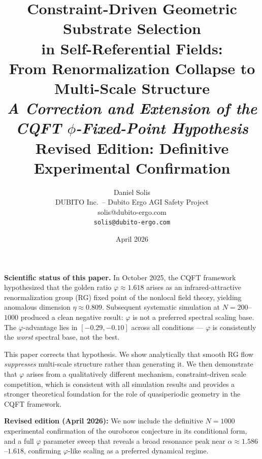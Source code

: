 \documentclass[11pt,a4paper]{article}
\title{%
  \textbf{Constraint-Driven Geometric Substrate Selection\\
  in Self-Referential Fields:}\\[6pt]
  \large From Renormalization Collapse to Multi-Scale Structure\\[6pt]
  \normalsize \textit{A Correction and Extension of the CQFT $\phi$-Fixed-Point
  Hypothesis}\\[8pt]
  \normalsize \textbf{Revised Edition: Definitive Experimental Confirmation}
}
\author{%
  Daniel Solis\\[4pt]
  \small DUBITO Inc.\ -- Dubito Ergo AGI Safety Project\\
  \small solis@dubito-ergo.com\\
  \small \texttt{solis@dubito-ergo.com}
}
\date{\small April 2026}
\theoremstyle{plain}
\theoremstyle{definition}
\newcommand{\phiGolden}{\varphi}
\begin{document}
\bigskip
\maketitle

\begin{correctionbox}
\textbf{Scientific status of this paper.}
In October 2025, the CQFT framework hypothesized that the golden ratio
$\phiGolden \approx 1.618$ arises as an infrared-attractive renormalization
group (RG) fixed point of the nonlocal field theory, yielding anomalous
dimension $\eta \approx 0.809$. Subsequent systematic simulation at
$N = 200$--$1000$ produced a clean negative result: $\phiGolden$ is not a
preferred spectral scaling base. The $\phiGolden$-advantage lies in
$[-0.29, -0.10]$ across all conditions --- $\phiGolden$ is consistently
the \emph{worst} spectral base, not the best.

This paper corrects that hypothesis. We show analytically that smooth RG
flow \emph{suppresses} multi-scale structure rather than generating it.
We then demonstrate that $\phiGolden$ arises from a qualitatively different
mechanism, constraint-driven scale competition, which is consistent
with all simulation results and provides a stronger theoretical foundation
for the role of quasiperiodic geometry in the CQFT framework.

\textbf{Revised edition (April 2026):} We now include the definitive
$N = 1000$ experimental confirmation of the ouroboros conjecture in its
conditional form, and a full $\phiGolden$ parameter sweep that reveals a
broad resonance peak near $\alpha \approx 1.586$--$1.618$, confirming
$\phiGolden$-like scaling as a preferred dynamical regime.
\end{correctionbox}
\end{document}

